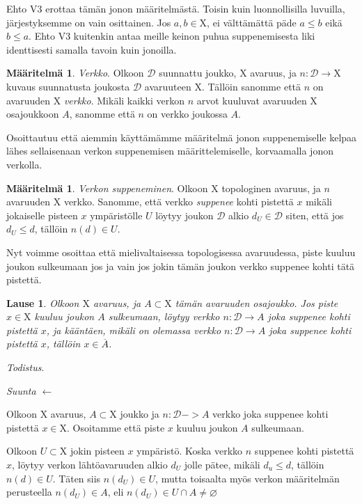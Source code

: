 \documentclass[12pt,a4paper,leqno]{report}
\newcommand{\X}{\mathrm{X}}
\newcommand{\D}{\mathcal{D}}
\newcommand{\verkop}{\leq}
\theoremstyle{plain}
\newtheorem{lause}[equation]{Lause}
\theoremstyle{definition}
\newtheorem{maar}[equation]{Määritelmä}
\theoremstyle{remark}
\begin{document}
Ehto V3 erottaa tämän jonon määritelmästä. Toisin kuin luonnollisilla luvuilla, järjestyksemme on vain osittainen. Jos $a, b \in \X$, ei välttämättä päde $a \verkop b$ eikä $b \verkop a$. Ehto V3 kuitenkin antaa meille keinon puhua suppenemisesta liki identtisesti samalla tavoin kuin jonoilla.

\begin{maar}\label{verkmaar}
\emph{Verkko}. Olkoon $\D$ suunnattu joukko, $\X$ avaruus, ja $n : \D \to \X$ kuvaus suunnatusta joukosta $\D$ avaruuteen $\X$. Tällöin sanomme että $n$ on avaruuden $\X$ \emph{verkko}. Mikäli kaikki verkon $n$ arvot kuuluvat avaruuden $\X$ osajoukkoon $A$, sanomme että $n$ on verkko joukossa $A$.
\end{maar}

Osoittautuu että aiemmin käyttämämme määritelmä jonon suppenemiselle kelpaa lähes sellaisenaan verkon suppenemisen määrittelemiselle, korvaamalla jonon verkolla.

\begin{maar}\label{verksupmaar}
\emph{Verkon suppeneminen}. Olkoon $\X$ topologinen avaruus, ja $n$ avaruuden $\X$ verkko. Sanomme, että verkko \emph{suppenee} kohti pistettä $x$ mikäli jokaiselle pisteen $x$ ympäristölle $U$ löytyy joukon $\D$ alkio $d_U \in \D$ siten, että jos $d_U \verkop d$, tällöin $n(d) \in U$.
\end{maar}

Nyt voimme osoittaa että mielivaltaisessa topologisessa avaruudessa, piste kuuluu joukon sulkeumaan jos ja vain jos jokin tämän joukon verkko suppenee kohti tätä pistettä.

\begin{lause}\label{verksulklause}
Olkoon $\X$ avaruus, ja $A \subset \X$ tämän avaruuden osajoukko. Jos piste $x \in \X$ kuuluu joukon $A$ sulkeumaan, löytyy verkko $n : \D \to A$ joka suppenee kohti pistettä $x$, ja kääntäen, mikäli on olemassa verkko $n : \D \to A$ joka suppenee kohti pistettä $x$, tällöin $x \in \overline{A}$.
\end{lause}

\noindent\emph{Todistus}.

\emph{Suunta $\leftarrow$}

Olkoon $\X$ avaruus, $A \subset \X$ joukko ja $n : \D -> A$ verkko joka suppenee kohti pistettä $x \in \X$. Osoitamme että piste $x$ kuuluu joukon $A$ sulkeumaan.

Olkoon $U \subset \X$ jokin pisteen $x$ ympäristö. Koska verkko $n$ suppenee kohti pistettä $x$, löytyy verkon lähtöavaruuden alkio $d_U$ jolle pätee, mikäli $d_u \verkop d$, tällöin $n(d) \in U$. Täten siis $n(d_U) \in U$, mutta toisaalta myös verkon määritelmän perusteella $n(d_U) \in A$, eli $n(d_U) \in U \cap A \not= \varnothing$
\end{document}

